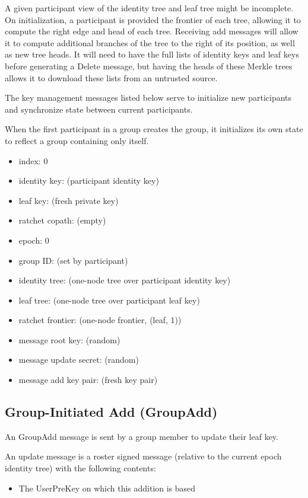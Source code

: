 \documentclass[11pt, oneside]{article}
\begin{document}
A given participant view of the identity tree and leaf tree might be incomplete.  On initialization, a participant is provided the frontier of each tree, allowing it to compute the right edge and head of each tree.  Receiving add messages will allow it to compute additional branches of the tree to the right of its position, as well as new tree heads.  It will need to have the full lists of identity keys and leaf keys before generating a Delete message, but having the heads of these Merkle trees allows it to download these lists from an untrusted source.

The key management messages listed below serve to initialize new participants and synchronize state between current participants.

When the first participant in a group creates the group, it initializes its own state to reflect a group containing only itself.

\begin{itemize}
\item{index: 0}
\item{identity key: (participant identity key)}
\item{leaf key: (fresh private key)}
\item{ratchet copath: (empty)}
\item{epoch: 0}
\item{group ID: (set by participant)}
\item{identity tree: (one-node tree over participant identity key)}
\item{leaf tree: (one-node tree over participant leaf key)}
\item{ratchet frontier: (one-node frontier, (leaf, 1))}
\item{message root key: (random)}
\item{message update secret: (random)}
\item{message add key pair: (fresh key pair)}
\end{itemize}


\subsection{Group-Initiated Add (GroupAdd)}

An GroupAdd message is sent by a group member to update their leaf key.  

An update message is a roster signed message (relative to the current epoch identity tree) with the following contents:

\begin{itemize}
\item{The UserPreKey on which this addition is based}
\end{itemize}
\end{document}
